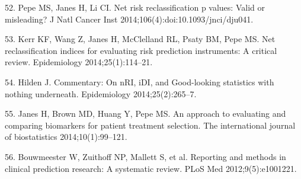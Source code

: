 \documentclass[11pt]{article}
\begin{document}
52. Pepe MS, Janes H, Li CI. Net risk reclassification p values: Valid
or misleading? J Natl Cancer Inst 2014;106(4):doi:10.1093/jnci/dju041.

53. Kerr KF, Wang Z, Janes H, McClelland RL, Psaty BM, Pepe MS. Net
reclassification indices for evaluating risk prediction instruments: A
critical review. Epidemiology 2014;25(1):114--21.

54. Hilden J. Commentary: On nRI, iDI, and Good-looking statistics
with nothing underneath. Epidemiology 2014;25(2):265--7.

55. Janes H, Brown MD, Huang Y, Pepe MS. An approach to evaluating and
comparing biomarkers for patient treatment selection. The international
journal of biostatistics 2014;10(1):99--121.

56. Bouwmeester W, Zuithoff NP, Mallett S, et al. Reporting and methods
in clinical prediction research: A systematic review. PLoS Med
2012;9(5):e1001221.
\end{document}
